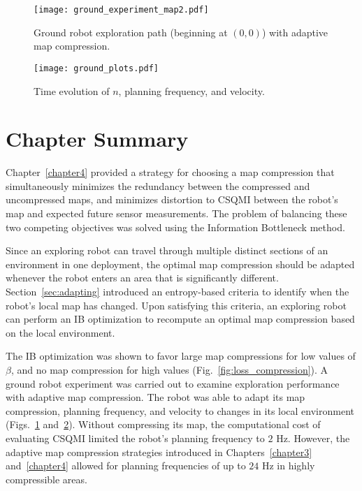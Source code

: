 \begin{figure}
  \centering
    \texttt{[image: ground\_experiment\_map2.pdf]}
    \caption[Exploration path with adaptive compression.]{Ground robot
    exploration path (beginning at $(0, 0)$) with adaptive map compression.
  \label{fig:ground_experiment}}
\end{figure}

\begin{figure}
    \centering
    \texttt{[image: ground\_plots.pdf]}
    \caption{Time evolution of $n$, planning frequency, and velocity.
    \label{fig:ib_exploration_plots}}
\end{figure}

\clearpage

\section{Chapter Summary}

Chapter~\ref{chapter4} provided a strategy for choosing a map compression that simultaneously
minimizes the redundancy between the compressed and uncompressed maps, and minimizes distortion
to CSQMI between the robot's map and expected future sensor measurements. The
problem of balancing these two competing objectives was solved using the
Information Bottleneck method.

Since an exploring robot can travel through multiple distinct sections of an
environment in one deployment, the optimal map compression should be adapted
whenever the robot enters an area that is significantly different. Section~\ref{sec:adapting}
introduced an entropy-based criteria to identify when the robot's local map has changed.
Upon satisfying this criteria, an exploring robot can perform an IB optimization to
recompute an optimal map compression based on the local environment.

The IB optimization was shown to favor large map compressions for low values of
$\beta$, and no map compression for high values (Fig.~\ref{fig:loss_compression}).
A ground robot experiment was carried out to examine exploration performance with
adaptive map compression. The robot was able to adapt its map compression,
planning frequency, and velocity to changes in its local environment
(Figs.~\ref{fig:ground_experiment} and~\ref{fig:ib_exploration_plots}).
Without compressing its map, the computational cost of evaluating CSQMI limited
the robot's planning frequency to $2$ Hz. However, the adaptive map compression
strategies introduced in Chapters~\ref{chapter3} and~\ref{chapter4} allowed
for planning frequencies of up to $24$ Hz in highly compressible areas.

